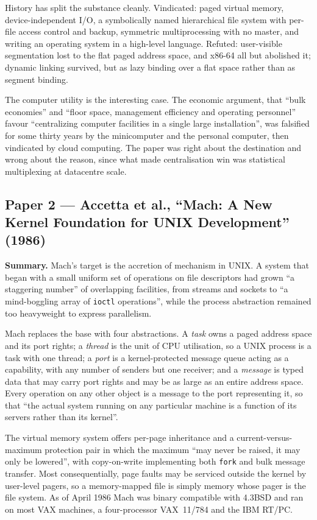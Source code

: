 History has split the substance cleanly. Vindicated: paged virtual memory,
device-independent I/O, a symbolically named hierarchical file system with per-file access
control and backup, symmetric multiprocessing with no master, and writing an operating
system in a high-level language. Refuted: user-visible segmentation lost to the flat paged
address space, and x86-64 all but abolished it; dynamic linking survived, but as lazy
binding over a flat space rather than as segment binding.

The computer utility is the interesting case. The economic argument, that ``bulk
economies'' and ``floor space, management efficiency and operating personnel'' favour
``centralizing computer facilities in a single large installation'', was falsified for some
thirty years by the minicomputer and the personal computer, then vindicated by cloud
computing. The paper was right about the destination and wrong about the reason, since what
made centralisation win was statistical multiplexing at datacentre scale.

\subsection*{Paper 2 --- Accetta et al., ``Mach: A New Kernel Foundation for UNIX Development'' (1986)}
\label{p4:sec:mach}

\textbf{Summary.} Mach's target is the accretion of mechanism in UNIX. A system that began
with a small uniform set of operations on file descriptors had grown ``a staggering
number'' of overlapping facilities, from streams and sockets to ``a mind-boggling array of
\texttt{ioctl} operations'', while the process abstraction remained too heavyweight to
express parallelism.

Mach replaces the base with four abstractions. A \emph{task} owns a paged address space and
its port rights; a \emph{thread} is the unit of CPU utilisation, so a UNIX process is a
task with one thread; a \emph{port} is a kernel-protected message queue acting as a
capability, with any number of senders but one receiver; and a \emph{message} is typed data
that may carry port rights and may be as large as an entire address space. Every operation
on any other object is a message to the port representing it, so that ``the actual system
running on any particular machine is a function of its servers rather than its kernel''.

The virtual memory system offers per-page inheritance and a current-versus-maximum
protection pair in which the maximum ``may never be raised, it may only be lowered'', with
copy-on-write implementing both \texttt{fork} and bulk message transfer. Most
consequentially, page faults may be serviced outside the kernel by user-level pagers, so a
memory-mapped file is simply memory whose pager is the file system. As of April 1986 Mach
was binary compatible with 4.3BSD and ran on most VAX machines, a four-processor
VAX~11/784 and the IBM RT/PC.

